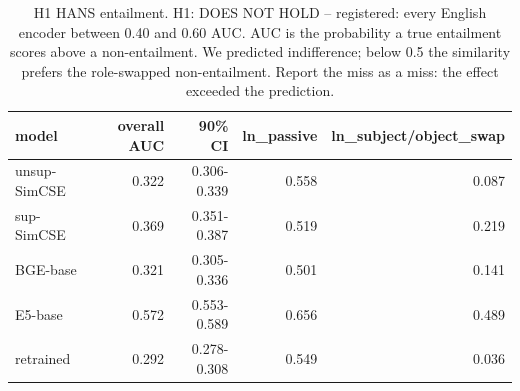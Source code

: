 \begin{table}[t]
\centering
\small
\caption{H1  HANS entailment. H1: DOES NOT HOLD -- registered: every English encoder between 0.40 and 0.60 AUC. AUC is the probability a true entailment scores above a non-entailment. We predicted indifference; below 0.5 the similarity prefers the role-swapped non-entailment. Report the miss as a miss: the effect exceeded the prediction.}
\begin{tabular}{lrrrr}
\toprule
model & overall AUC & 90\% CI & ln\_passive & ln\_subject/object\_swap \\
\midrule
unsup-SimCSE & 0.322 & 0.306-0.339 & 0.558 & 0.087 \\
sup-SimCSE & 0.369 & 0.351-0.387 & 0.519 & 0.219 \\
BGE-base & 0.321 & 0.305-0.336 & 0.501 & 0.141 \\
E5-base & 0.572 & 0.553-0.589 & 0.656 & 0.489 \\
retrained & 0.292 & 0.278-0.308 & 0.549 & 0.036 \\
\bottomrule
\end{tabular}
\end{table}
